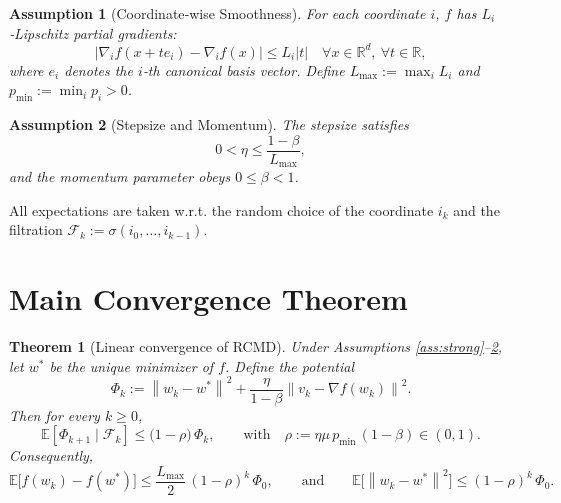 \documentclass{article}
\newtheorem{theorem}{Theorem}
\newtheorem{assumption}{Assumption}
\newcommand{\E}{\mathbb{E}}
\newcommand{\R}{\mathbb{R}}
\newcommand{\norm}[1]{\left\|#1\right\|}
\begin{document}
\begin{assumption}[Coordinate‑wise Smoothness]\label{ass:smooth}
For each coordinate $i$, $f$ has $L_i$‑Lipschitz partial gradients:
\[
\bigl|\nabla_i f(x+te_i)-\nabla_i f(x)\bigr|\le L_i |t|
\quad\forall x\in\R^{d},\ \forall t\in\R,
\]
where $e_i$ denotes the $i$‑th canonical basis vector.  
Define $L_{\max}:=\max_i L_i$ and $p_{\min}:=\min_i p_i>0$.
\end{assumption}

\begin{assumption}[Stepsize and Momentum]\label{ass:params}
The stepsize satisfies
\[
0<\eta\le\frac{1-\beta}{L_{\max}} ,
\]
and the momentum parameter obeys $0\le\beta<1$.
\end{assumption}

All expectations are taken w.r.t. the random choice of the coordinate $i_k$ and the filtration $\mathcal{F}_k:=\sigma(i_0,\dots,i_{k-1})$.

\section*{Main Convergence Theorem}
\begin{theorem}[Linear convergence of RCMD]\label{thm:linear}
Under Assumptions \ref{ass:strong}–\ref{ass:params}, let $w^*$ be the unique minimizer of $f$. Define the potential
\[
\Phi_k:=\norm{w_k-w^*}^{2}+\frac{\eta}{1-\beta}\norm{v_k-\nabla f(w_k)}^{2}.
\]
Then for every $k\ge0$,
\[
\E[\Phi_{k+1}\mid\mathcal{F}_k]\le\bigl(1-\rho\bigr)\,\Phi_k,
\qquad\text{with}\quad 
\rho:=\eta\mu\,p_{\min}\,(1-\beta)\in(0,1).
\tag{3}
\]
Consequently,
\[
\E\!\bigl[f(w_k)-f(w^*)\bigr]\le\frac{L_{\max}}{2}\,(1-\rho)^{k}\,\Phi_0,
\qquad
\text{and}\qquad
\E\!\bigl[\norm{w_k-w^*}^{2}\bigr]\le(1-\rho)^{k}\,\Phi_0 .
\]
\end{theorem}
\end{document}
